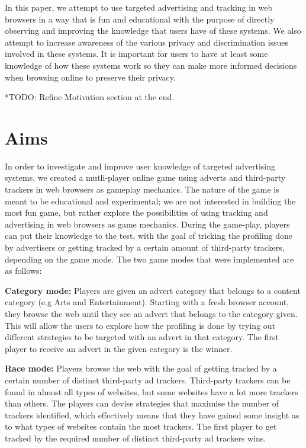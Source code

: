 \documentclass{l4proj}
\begin{document}
In this paper, we attempt to use targeted advertising and tracking in web browsers in a way that is fun and educational with the purpose of directly observing and improving the knowledge that users have of these systems. We also attempt to increase awareness of the various privacy and discrimination issues involved in these systems. It is important for users to have at least some knowledge of how these systems work so they can make more informed decisions when browsing online to preserve their privacy.

*TODO: Refine Motivation section at the end.

\section{Aims}
In order to investigate and improve user knowledge of targeted advertising systems, we created a mutli-player online game using adverts and third-party trackers in web browsers as gameplay mechanics. The nature of the game is meant to be educational and experimental; we are not interested in building the most fun game, but rather explore the possibilities of using tracking and advertising in web browsers as game mechanics. During the game-play, players can put their knowledge to the test, with the goal of tricking the profiling done by advertisers or getting tracked by a certain amount of third-party trackers, depending on the game mode. The two game modes that were implemented are as follows:

\textbf{Category mode:} Players are given an advert category that belongs to a content category (e.g Arts and Entertainment). Starting with a fresh browser account, they browse the web until they see an advert that belongs to the category given. This will allow the users to explore how the profiling is done by trying out different strategies to be targeted with an advert in that category. The first player to receive an advert in the given category is the winner. 

\textbf{Race mode:} Players browse the web with the goal of getting tracked by a certain number of distinct third-party ad trackers. Third-party trackers can be found in almost all types of websites, but some websites have a lot more trackers than others. The players can devise strategies that maximise the number of trackers identified, which effectively means that they have gained some insight as to what types of websites contain the most trackers. The first player to get tracked by the required number of distinct third-party ad trackers wins.
\end{document}
